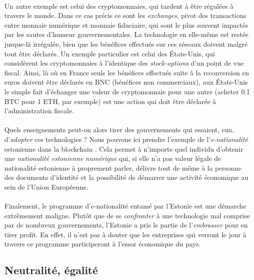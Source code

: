 \paragraph{} Un autre exemple est celui des cryptomonnaies, qui tardent à être régulées à travers le monde. Dans ce cas
précis ce sont les \emph{exchanges}, pivot des transactions entre monnaie numérique et monnaie fiduciaire, qui sont le 
plus souvent impactés par les sautes d'humeur gouvernementales. La technologie en elle-même est restée jusque-là irrégulée,
bien que les bénéfices effectués sur ces réseaux doivent malgré tout être déclarés. Un exemple particulier est celui des 
États-Unis, qui considèrent les cryptomonnaies à l'identique des \emph{stock-options} d'un point de vue fiscal. Ainsi, 
là où en France seuls les bénéfices effectués suite à la reconversion en euros doivent être déclarés en BNC (bénéfices non
commerciaux), aux États-Unis le simple fait d'échanger une valeur de cryptomonnaie pour une autre (acheter 0.1 BTC pour 
1 ETH, par exemple) est une action qui doit être déclarée à l'administration fiscale.

\paragraph{} Quels enseignements peut-on alors tirer des gouvernements qui essaient, eux, d'\emph{adopter} ces technologies ? 
Nous pouvons ici prendre l'exemple de l'\emph{e-nationalité} estonienne dans la blockchain \cite{Blockchain3}. Cela permet
à n'importe quel individu d'obtenir une \emph{nationalité estonienne numérique} qui, si elle n'a pas valeur légale de
nationalité estonienne à proprement parler, délivre tout de même à la personne des documents d'identité et la possibilité
de démarrer une activité économique au sein de l'Union Européenne.

\paragraph{} Finalement, le programme d'e-nationalité entamé par l'Estonie est une démarche extrêmement maligne. Plutôt
que de se \emph{confronter} à une technologie mal comprise par de nombreux gouvernements, l'Estonie a pris le partie de
l'\emph{embrasser} pour en tirer profit. En effet, il n'est pas à douter que les entreprises qui verront le jour à travers
ce programme participeront à l'essor économique du pays.

\subsection*{Neutralité, égalité}


